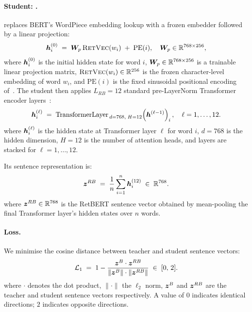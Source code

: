 \paragraph{Student: \RetBERT{}.}
\RetBERT{} replaces BERT's WordPiece embedding lookup with a frozen
\RetVec{} embedder followed by a linear projection:
\begin{equation}
  \bm{h}^{(0)}_{i}
  \;=\;
  \bm{W}_{p}\,\textsc{RetVec}(w_i) \;+\; \text{PE}(i),
  \quad \bm{W}_{p} \in \mathbb{R}^{768 \times 256},
  \label{eq:retbert_input}
\end{equation}
\noindent where $\bm{h}^{(0)}_{i}$ is the initial hidden state for word $i$, $\bm{W}_{p} \in \mathbb{R}^{768 \times 256}$ is a trainable linear projection matrix, $\textsc{RetVec}(w_i) \in \mathbb{R}^{256}$ is the frozen character-level embedding of word $w_i$, and $\text{PE}(i)$ is the fixed sinusoidal positional encoding
of~\citet{vaswani2017attention}.
The student then applies $L_{RB}=12$ standard pre-LayerNorm Transformer
encoder layers~\citep{xiong2020layer}:
\begin{equation}
  \bm{h}^{(\ell)}_{i}
  \;=\;
  \text{TransformerLayer}_{\,d=768,\;H=12}
  \!\left(\bm{h}^{(\ell-1)}\right)_{i},
  \quad \ell = 1, \ldots, 12.
  \label{eq:retbert_layers}
\end{equation}
\noindent where $\bm{h}^{(\ell)}_{i}$ is the hidden state at Transformer layer $\ell$ for word $i$, $d{=}768$ is the hidden dimension, $H{=}12$ is the number of attention heads, and layers are stacked for $\ell = 1, \ldots, 12$.

Its sentence representation is:
\begin{equation}
  \bm{z}^{RB} \;=\; \frac{1}{n}\sum_{i=1}^{n} \bm{h}^{(12)}_{i}
  \;\in\; \mathbb{R}^{768}.
  \label{eq:retbert_sent}
\end{equation}
\noindent where $\bm{z}^{RB} \in \mathbb{R}^{768}$ is the RetBERT sentence vector obtained by mean-pooling the final Transformer layer's hidden states over $n$ words.

\paragraph{Loss.}
We minimise the cosine distance between teacher and student sentence vectors:
\begin{equation}
  \mathcal{L}_{1}
  \;=\;
  1 - \frac{\bm{z}^{B} \cdot \bm{z}^{RB}}
           {\|\bm{z}^{B}\| \cdot \|\bm{z}^{RB}\|}
  \;\in\; [0,\, 2].
  \label{eq:loss1}
\end{equation}
\noindent where $\cdot$ denotes the dot product, $\|\cdot\|$ the $\ell_2$ norm, $\bm{z}^{B}$ and $\bm{z}^{RB}$ are the teacher and student sentence vectors respectively. A value of $0$ indicates identical directions; $2$ indicates opposite directions.

